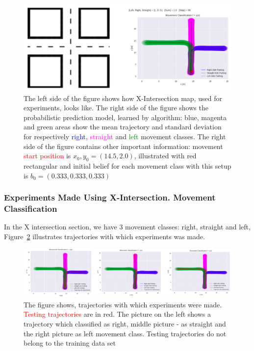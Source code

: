 \begin{figure}[H]
	\centering  	
	\includegraphics[width=13cm]{img/XInt.png}
	\caption{The left side of the figure shows how X-Intersection map, used for experiments, looks like. The right side of the figure shows the probabilistic prediction model, learned by algorithm:  blue, magenta and green areas show the mean trajectory and standard deviation for respectively \textcolor{blue}{right}, \textcolor{magenta}{straight} and \textcolor{green}{left} movement classes. The right side of the figure contains other important information: movement \textcolor{red}{start position} is $x_0,y_0 = (14.5, 2.0)$, illustrated with red rectangular and initial belief for each movement class with this setup is $b_0 = (0.333, 0.333, 0.333)$}
	\label{fig:Xint}    
\end{figure}

\subsubsection{Experiments Made Using X-Intersection. Movement Classification}

In the X intersection section, we have $3$ movement classes: right, straight and left, Figure~\ref{fig:MovClasses} illustrates trajectories with which experiments was made.

\begin{figure}[H]
	\centering  	
	\includegraphics[width=18cm]{img/movetr.png}
	\caption{The figure shows, trajectories with which experiments were made. \textcolor{red}{Testing trajectories} are in red. The picture on the left shows a trajectory which classified as right, middle picture - as straight and the right picture as left movement class. Testing trajectories do not belong to the training data set}
	\label{fig:MovClasses}    
\end{figure}


